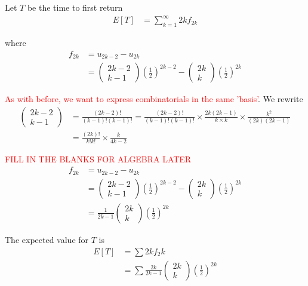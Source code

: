 Let $T$ be the time to first return
\begin{align*}
  E\left[ T\right]  &= \sum_{k = 1}^{\infty} 2k f_{2k}
\end{align*}

where
\begin{align*}
  f_{2k} &= u_{2k - 2} - u_{2k} \\
  &= \begin{pmatrix} 2k - 2 \\ k - 1 \end{pmatrix}  \left( \frac{1}{2} \right)^{2k - 2} - \begin{pmatrix}  2k \\ k \end{pmatrix}  \left( \frac{1}{2} \right)^{2k}
\end{align*}

\textcolor{red}{As with before, we want to express combinatorials in the same 'basis'}. We rewrite
\begin{align*}
  \begin{pmatrix} 2k - 2 \\ k - 1 \end{pmatrix}  &= \frac{(2k - 2)!}{(k-1)! (k-1)!} = \frac{(2k-2)!}{(k-1)! (k-1)!} \times \frac{2k (2k-1)}{k \times k} \times \frac{k^2}{(2k)(2k-1)} \\ 
  &= \frac{(2k)!}{k! k!} \times \frac{k}{4k - 2}
\end{align*}

\textcolor{red}{FILL IN THE BLANKS FOR ALGEBRA LATER}
\begin{align*}
  f_{2k} &= u_{2k - 2} - u_{2k} \\
  &= \begin{pmatrix} 2k - 2 \\ k - 1 \end{pmatrix}  \left( \frac{1}{2} \right)^{2k - 2} - \begin{pmatrix}  2k \\ k \end{pmatrix}  \left( \frac{1}{2} \right)^{2k} \\
  &= \frac{1}{2k - 1} \begin{pmatrix} 2k \\ k \end{pmatrix} \left( \frac{1}{2} \right)^{2k}
\end{align*}

The expected value for $T$ is
\begin{align*}
  E\left[ T\right]  &= \sum 2k f_2k  \\
  &= \sum \frac{2k}{2k - 1} \begin{pmatrix} 2k \\ k \end{pmatrix}  \left( \frac{1}{2}  \right)^{2k}
\end{align*}

